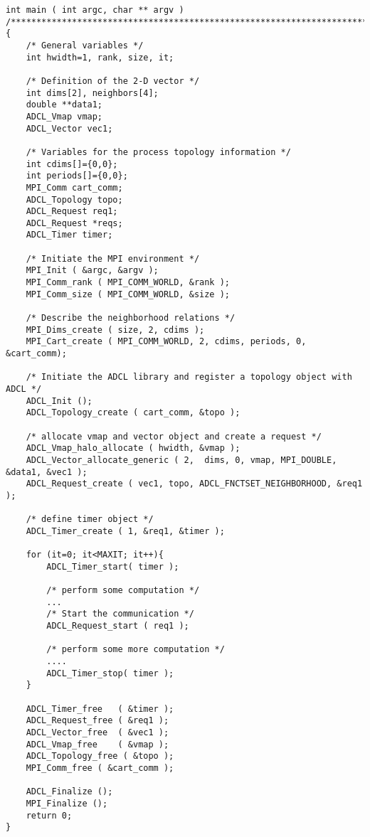 \begin{verbatim}
int main ( int argc, char ** argv ) 
/**********************************************************************/
{
    /* General variables */
    int hwidth=1, rank, size, it;
    
    /* Definition of the 2-D vector */
    int dims[2], neighbors[4];
    double **data1;
    ADCL_Vmap vmap;
    ADCL_Vector vec1;

    /* Variables for the process topology information */
    int cdims[]={0,0};
    int periods[]={0,0};
    MPI_Comm cart_comm;
    ADCL_Topology topo;
    ADCL_Request req1;
    ADCL_Request *reqs;  
    ADCL_Timer timer;

    /* Initiate the MPI environment */
    MPI_Init ( &argc, &argv );
    MPI_Comm_rank ( MPI_COMM_WORLD, &rank );
    MPI_Comm_size ( MPI_COMM_WORLD, &size );

    /* Describe the neighborhood relations */
    MPI_Dims_create ( size, 2, cdims );
    MPI_Cart_create ( MPI_COMM_WORLD, 2, cdims, periods, 0, &cart_comm);

    /* Initiate the ADCL library and register a topology object with ADCL */
    ADCL_Init ();
    ADCL_Topology_create ( cart_comm, &topo );

    /* allocate vmap and vector object and create a request */
    ADCL_Vmap_halo_allocate ( hwidth, &vmap );
    ADCL_Vector_allocate_generic ( 2,  dims, 0, vmap, MPI_DOUBLE, &data1, &vec1 );
    ADCL_Request_create ( vec1, topo, ADCL_FNCTSET_NEIGHBORHOOD, &req1 );

    /* define timer object */
    ADCL_Timer_create ( 1, &req1, &timer );

    for (it=0; it<MAXIT; it++){
        ADCL_Timer_start( timer );

        /* perform some computation */ 
        ...       
        /* Start the communication */
        ADCL_Request_start ( req1 );

        /* perform some more computation */
        ....
        ADCL_Timer_stop( timer );
    }

    ADCL_Timer_free   ( &timer );
    ADCL_Request_free ( &req1 );
    ADCL_Vector_free  ( &vec1 );
    ADCL_Vmap_free    ( &vmap );
    ADCL_Topology_free ( &topo );
    MPI_Comm_free ( &cart_comm );
    
    ADCL_Finalize ();
    MPI_Finalize ();
    return 0;
}

\end{verbatim}

